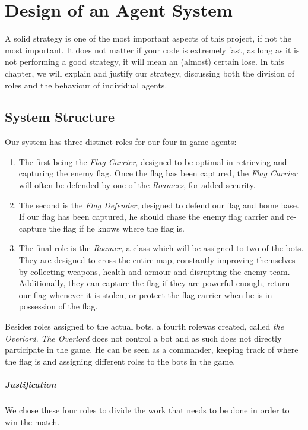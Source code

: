 \chapter{Design of an Agent System}

A solid strategy is one of the most important aspects of this project, if not the most important. It does not matter if your code is extremely fast, as long as it is not performing a good strategy, it will mean an (almost) certain lose. In this chapter, we will explain and justify our strategy, discussing both the division of roles and the behaviour of individual agents.

\section{System Structure}
Our system has three distinct roles for our four in-game agents:

\begin{enumerate}
\item The first being the \emph{Flag Carrier}, designed to be optimal in retrieving and capturing the enemy flag. Once the flag has been captured, the \emph{ Flag Carrier} will often be defended by one of the \emph{Roamers}, for added security.

\item The second is the \emph{Flag Defender}, designed to defend our flag and home base. If our flag has been captured, he should chase the enemy flag carrier and re-capture the flag if he knows where the flag is. 

\item The final role is the \emph{Roamer}, a class which will be assigned to two of the bots. They are designed to cross the entire map, constantly improving themselves by collecting weapons, health and armour and disrupting the enemy team. Additionally, they can capture the flag if they are powerful enough, return our flag whenever it is stolen, or protect the flag carrier when he is in possession of the flag.
\end{enumerate}

Besides roles assigned to the actual bots, a fourth rolewas created, called \emph{the Overlord}. \emph{The Overlord} does not control a bot and as such does not directly participate in the game. He can be seen as a commander, keeping track of where the flag is and assigning different roles to the bots in the game.\\

\paragraph{Justification}
We chose these four roles to divide the work that needs to be done in order to win the match.

